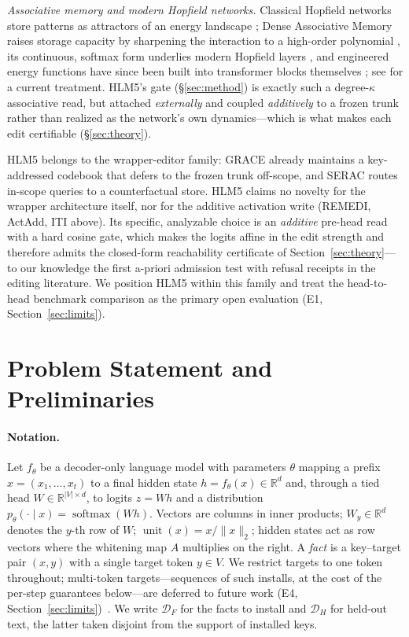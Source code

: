 \documentclass[10pt,twocolumn]{article}
\theoremstyle{remark}
\DeclareMathOperator{\softmax}{softmax}
\DeclareMathOperator{\unit}{unit}
\newcommand{\R}{\mathbb{R}}
\newcommand{\Df}{\mathcal{D}_F}
\newcommand{\Dh}{\mathcal{D}_H}
\begin{document}
\emph{Associative memory and modern Hopfield networks.} Classical Hopfield networks
store patterns as attractors of an energy landscape \citep{hopfield1982neural};
Dense Associative Memory raises storage capacity by sharpening the interaction to a
high-order polynomial \citep{krotov2016dense, krotov2021large}, its continuous,
softmax form underlies modern Hopfield layers \citep{ramsauer2020hopfield}, and
engineered energy functions have since been built into transformer blocks
themselves \citep{hoover2023energy}; see \citet{krotov2025modern} for a current
treatment. HLM5's
gate (\S\ref{sec:method}) is exactly such a degree-$\kappa$ associative read, but
attached \emph{externally} and coupled \emph{additively} to a frozen trunk rather
than realized as the network's own dynamics---which is what makes each edit
certifiable (\S\ref{sec:theory}).

HLM5 belongs to the wrapper-editor family: GRACE already maintains a
key-addressed codebook that defers to the frozen trunk off-scope, and SERAC
routes in-scope queries to a counterfactual store. HLM5 claims no novelty for
the wrapper architecture itself, nor for the additive activation write
(REMEDI, ActAdd, ITI above). Its specific, analyzable choice is an \emph{additive}
pre-head read with a hard cosine gate, which makes the logits affine in the edit
strength and therefore admits the closed-form reachability certificate of
Section~\ref{sec:theory}---to our knowledge the first a-priori admission test
with refusal receipts in the editing literature. We position HLM5 within this
family and treat the head-to-head benchmark comparison as the primary open
evaluation (E1, Section~\ref{sec:limits}).

\section{Problem Statement and Preliminaries}
\label{sec:prelim}

\paragraph{Notation.}
Let $f_\theta$ be a decoder-only language model with parameters $\theta$ mapping a
prefix $x=(x_1,\dots,x_t)$ to a final hidden state $h=f_\theta(x)\in\R^{d}$ and,
through a tied head $W\in\R^{|V|\times d}$, to logits $z=Wh$ and a distribution
$p_\theta(\cdot\mid x)=\softmax(Wh)$. Vectors are columns in inner products;
$W_y\in\R^{d}$ denotes the $y$-th row of $W$; $\unit(x)=x/\lVert x\rVert_2$;
hidden states act as row vectors where the whitening map $A$ multiplies on the
right. A \emph{fact} is a key--target pair $(x,y)$
with a single target token $y\in V$. We restrict targets to one token throughout;
multi-token targets---sequences of such installs, at the cost of the per-step
guarantees below---are deferred to future work (E4,
Section~\ref{sec:limits})~\citep{jiang2025anyedit}. We write $\Df$ for the facts to install and
$\Dh$ for held-out text, the latter taken disjoint from the support of installed
keys.
\end{document}
